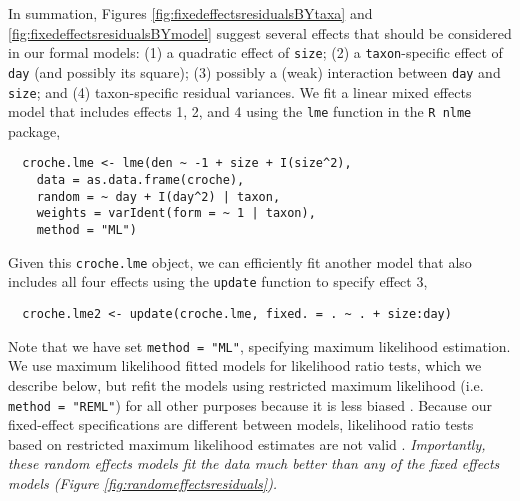 \documentclass[12pt]{ecologyFORAPPENDIX}
\begin{document}
In summation, Figures \ref{fig:fixedeffectsresidualsBYtaxa} and \ref{fig:fixedeffectsresidualsBYmodel} suggest several effects that should be considered in our formal models: (1) a quadratic effect of \texttt{size}; (2) a \texttt{taxon}-specific effect of \texttt{day} (and possibly its square); (3) possibly a (weak) interaction between \texttt{day} and \texttt{size}; and (4) taxon-specific residual variances.  We fit a linear mixed effects model that includes effects 1, 2, and 4 using the \texttt{lme} function in the \texttt{R nlme} package,
\vspace{-12pt}
\singlespace 
\begin{verbatim}
  croche.lme <- lme(den ~ -1 + size + I(size^2),
    data = as.data.frame(croche),
    random = ~ day + I(day^2) | taxon,
    weights = varIdent(form = ~ 1 | taxon),
    method = "ML")
\end{verbatim}
\doublespace
Given this \texttt{croche.lme} object, we can efficiently fit another model that also includes all four effects using the \texttt{update} function to specify effect 3,
\begin{verbatim}
  croche.lme2 <- update(croche.lme, fixed. = . ~ . + size:day)
\end{verbatim}
Note that we have set \texttt{method = "ML"}, specifying maximum likelihood estimation.  We use maximum likelihood fitted models for likelihood ratio tests, which we describe below, but refit the models using restricted maximum likelihood (i.e. \texttt{method = "REML"}) for all other purposes because it is less biased \citep{PinheiroAndBates2000}.  Because our fixed-effect specifications are different between models, likelihood ratio tests based on restricted maximum likelihood estimates are not valid \citep{PinheiroAndBates2000}.  \emph{Importantly, these random effects models fit the data much better than any of the fixed effects models (Figure \ref{fig:randomeffectsresiduals}).}

\end{document}
